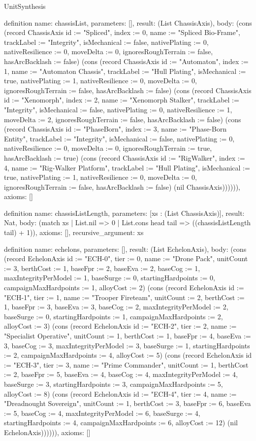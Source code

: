 \begin{lexlean}{UnitSynthesis}
\begin{semanticmodule}
definition{
  name: chassisList,
  parameters: [],
  result: (List ChassisAxis),
  body: (cons (record ChassisAxis {id := "Spliced", index := 0, name := "Spliced Bio-Frame", trackLabel := "Integrity", isMechanical := false, nativePlating := 0, nativeResilience := 0, moveDelta := 0, ignoresRoughTerrain := false, hasArcBacklash := false}) (cons (record ChassisAxis {id := "Automaton", index := 1, name := "Automaton Chassis", trackLabel := "Hull Plating", isMechanical := true, nativePlating := 1, nativeResilience := 0, moveDelta := 0, ignoresRoughTerrain := false, hasArcBacklash := false}) (cons (record ChassisAxis {id := "Xenomorph", index := 2, name := "Xenomorph Stalker", trackLabel := "Integrity", isMechanical := false, nativePlating := 0, nativeResilience := 1, moveDelta := 2, ignoresRoughTerrain := false, hasArcBacklash := false}) (cons (record ChassisAxis {id := "PhaseBorn", index := 3, name := "Phase-Born Entity", trackLabel := "Integrity", isMechanical := false, nativePlating := 0, nativeResilience := 0, moveDelta := 0, ignoresRoughTerrain := true, hasArcBacklash := true}) (cons (record ChassisAxis {id := "RigWalker", index := 4, name := "Rig-Walker Platform", trackLabel := "Hull Plating", isMechanical := true, nativePlating := 1, nativeResilience := 0, moveDelta := 0, ignoresRoughTerrain := false, hasArcBacklash := false}) (nil ChassisAxis)))))),
  axioms: []
}

definition{
  name: chassisListLength,
  parameters: [xs : (List ChassisAxis)],
  result: Nat,
  body: (match xs
    | List.nil => 0
    | List.cons head tail => ((chassisListLength tail) + 1)),
  axioms: [],
  recursive_argument: xs
}

definition{
  name: echelons,
  parameters: [],
  result: (List EchelonAxis),
  body: (cons (record EchelonAxis {id := "ECH-0", tier := 0, name := "Drone Pack", unitCount := 3, berthCost := 1, baseFpr := 2, baseEva := 2, baseCog := 1, maxIntegrityPerModel := 1, baseSurge := 0, startingHardpoints := 0, campaignMaxHardpoints := 1, alloyCost := 2}) (cons (record EchelonAxis {id := "ECH-1", tier := 1, name := "Trooper Fireteam", unitCount := 2, berthCost := 1, baseFpr := 3, baseEva := 3, baseCog := 2, maxIntegrityPerModel := 2, baseSurge := 0, startingHardpoints := 1, campaignMaxHardpoints := 2, alloyCost := 3}) (cons (record EchelonAxis {id := "ECH-2", tier := 2, name := "Specialist Operative", unitCount := 1, berthCost := 1, baseFpr := 4, baseEva := 3, baseCog := 3, maxIntegrityPerModel := 3, baseSurge := 1, startingHardpoints := 2, campaignMaxHardpoints := 4, alloyCost := 5}) (cons (record EchelonAxis {id := "ECH-3", tier := 3, name := "Prime Commander", unitCount := 1, berthCost := 2, baseFpr := 5, baseEva := 4, baseCog := 4, maxIntegrityPerModel := 4, baseSurge := 3, startingHardpoints := 3, campaignMaxHardpoints := 5, alloyCost := 8}) (cons (record EchelonAxis {id := "ECH-4", tier := 4, name := "Dreadnought Sovereign", unitCount := 1, berthCost := 3, baseFpr := 6, baseEva := 5, baseCog := 4, maxIntegrityPerModel := 6, baseSurge := 4, startingHardpoints := 4, campaignMaxHardpoints := 6, alloyCost := 12}) (nil EchelonAxis)))))),
  axioms: []
}


\end{semanticmodule}
\end{lexlean}
